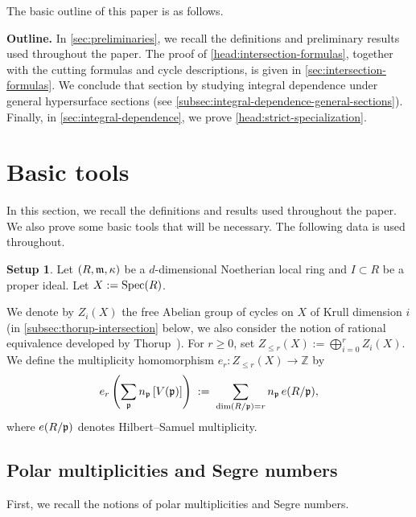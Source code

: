 \documentclass[a4paper, 11pt]{amsart}
\newcommand{\ZZ}{\mathbb{Z}}
\newcommand{\mm}{{\normalfont\mathfrak{m}}}
\newcommand{\pp}{{\normalfont\mathfrak{p}}}
\newcommand{\Spec}{\normalfont\text{Spec}}
\theoremstyle{definition}
\newtheorem{setup}[setup]{Setup}
\begin{document}
	The basic outline of this paper is as follows.
	
	\medskip
	\noindent
	\textbf{Outline.}
	In \autoref{sec:preliminaries}, we recall the definitions and preliminary
	results used throughout the paper. The proof of
	\autoref{head:intersection-formulas}, together with the cutting formulas
	and cycle descriptions, is given in \autoref{sec:intersection-formulas}.
	We conclude that section by studying integral dependence under general hypersurface sections (see \autoref{subsec:integral-dependence-general-sections}).
	Finally, in \autoref{sec:integral-dependence}, we prove
	\autoref{head:strict-specialization}.
	
	
	\section{Basic tools}
	\label{sec:preliminaries}
	\label{sec:intersection-general-sections}
	In this section, we recall the definitions and results used throughout the
	paper. 
	We also prove some basic tools that will be necessary.
	The following data is used throughout. 
	
	
	\begin{setup}
		\label{setup_basic}
		Let $(R,\mm,\kappa)$ be a $d$-dimensional Noetherian local ring and
		$I\subset R$ be a proper ideal.
		Let $X:=\Spec(R)$.		
	\end{setup}
	
We denote by $Z_i(X)$ the free Abelian group of cycles on $X$ of Krull dimension $i$ (in \autoref{subsec:thorup-intersection} below, we also consider the notion of rational equivalence developed by Thorup~\cite{Thorup}).
	For $r\geq0$, set $Z_{\leq r}(X):=\bigoplus_{i=0}^r Z_i(X)$.
	We define the multiplicity homomorphism $e_r\colon Z_{\leq r}(X)\to\ZZ$ by
	$$
	e_r\left(\sum_{\pp}n_{\pp}\left[V(\pp)\right]\right)
	\;:=\;\sum_{\dim(R/\pp)=r}n_{\pp}\,e(R/\pp),
	$$
	where $e(R/\pp)$ denotes Hilbert--Samuel multiplicity.
	
	
	\subsection{Polar multiplicities and Segre numbers}
	First, we recall the notions of polar multiplicities and Segre numbers. 	
	
\end{document}
